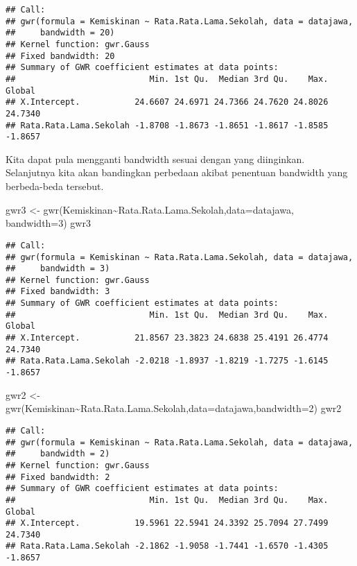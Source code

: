 \documentclass[
]{book}
\newenvironment{Shaded}{\begin{snugshade}}{\end{snugshade}}
\newcommand{\AttributeTok}[1]{\textcolor[rgb]{0.77,0.63,0.00}{#1}}
\newcommand{\DecValTok}[1]{\textcolor[rgb]{0.00,0.00,0.81}{#1}}
\newcommand{\FunctionTok}[1]{\textcolor[rgb]{0.00,0.00,0.00}{#1}}
\newcommand{\NormalTok}[1]{#1}
\newcommand{\OtherTok}[1]{\textcolor[rgb]{0.56,0.35,0.01}{#1}}
\newcommand{\SpecialCharTok}[1]{\textcolor[rgb]{0.00,0.00,0.00}{#1}}
\begin{document}
\begin{verbatim}
## Call:
## gwr(formula = Kemiskinan ~ Rata.Rata.Lama.Sekolah, data = datajawa, 
##     bandwidth = 20)
## Kernel function: gwr.Gauss 
## Fixed bandwidth: 20 
## Summary of GWR coefficient estimates at data points:
##                           Min. 1st Qu.  Median 3rd Qu.    Max.  Global
## X.Intercept.           24.6607 24.6971 24.7366 24.7620 24.8026 24.7340
## Rata.Rata.Lama.Sekolah -1.8708 -1.8673 -1.8651 -1.8617 -1.8585 -1.8657
\end{verbatim}

Kita dapat pula mengganti bandwidth sesuai dengan yang diinginkan. Selanjutnya kita akan bandingkan perbedaan akibat penentuan bandwidth yang berbeda-beda tersebut.

\begin{Shaded}
\begin{Highlighting}[]
\NormalTok{gwr3 }\OtherTok{\textless{}{-}} \FunctionTok{gwr}\NormalTok{(Kemiskinan}\SpecialCharTok{\textasciitilde{}}\NormalTok{Rata.Rata.Lama.Sekolah,}\AttributeTok{data=}\NormalTok{datajawa, }\AttributeTok{bandwidth=}\DecValTok{3}\NormalTok{)}
\NormalTok{gwr3}
\end{Highlighting}
\end{Shaded}

\begin{verbatim}
## Call:
## gwr(formula = Kemiskinan ~ Rata.Rata.Lama.Sekolah, data = datajawa, 
##     bandwidth = 3)
## Kernel function: gwr.Gauss 
## Fixed bandwidth: 3 
## Summary of GWR coefficient estimates at data points:
##                           Min. 1st Qu.  Median 3rd Qu.    Max.  Global
## X.Intercept.           21.8567 23.3823 24.6838 25.4191 26.4774 24.7340
## Rata.Rata.Lama.Sekolah -2.0218 -1.8937 -1.8219 -1.7275 -1.6145 -1.8657
\end{verbatim}

\begin{Shaded}
\begin{Highlighting}[]
\NormalTok{gwr2 }\OtherTok{\textless{}{-}} \FunctionTok{gwr}\NormalTok{(Kemiskinan}\SpecialCharTok{\textasciitilde{}}\NormalTok{Rata.Rata.Lama.Sekolah,}\AttributeTok{data=}\NormalTok{datajawa,}\AttributeTok{bandwidth=}\DecValTok{2}\NormalTok{)}
\NormalTok{gwr2}
\end{Highlighting}
\end{Shaded}

\begin{verbatim}
## Call:
## gwr(formula = Kemiskinan ~ Rata.Rata.Lama.Sekolah, data = datajawa, 
##     bandwidth = 2)
## Kernel function: gwr.Gauss 
## Fixed bandwidth: 2 
## Summary of GWR coefficient estimates at data points:
##                           Min. 1st Qu.  Median 3rd Qu.    Max.  Global
## X.Intercept.           19.5961 22.5941 24.3392 25.7094 27.7499 24.7340
## Rata.Rata.Lama.Sekolah -2.1862 -1.9058 -1.7441 -1.6570 -1.4305 -1.8657
\end{verbatim}
\end{document}
